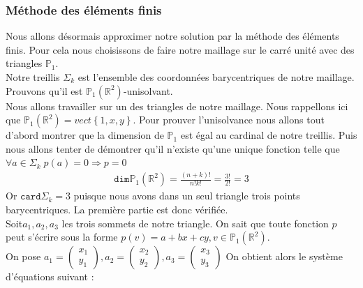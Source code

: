 \subsubsection{Méthode des éléments finis}
Nous allons désormais approximer notre solution par la méthode des éléments finis. Pour cela nous choisissons de faire notre maillage sur le carré unité avec des triangles $\mathbb{P}_{1}$.\\
Notre treillis $\Sigma_{k}$ est l'ensemble des coordonnées barycentriques de notre maillage. Prouvons qu'il est $\mathbb{P}_{1}\left(\mathbb{R}^ {2}\right)$-unisolvant.\\
Nous allons travailler sur un des triangles de notre maillage. Nous rappellons ici que $\mathbb{P}_{1}\left(\mathbb{R}^ {2}\right)=vect\left\{1, x, y\right\}$. Pour prouver l'unisolvance nous allons tout d'abord montrer que la dimension de $\mathbb{P}_{1}$ est égal au cardinal de notre treillis. Puis nous allons tenter de démontrer qu'il n'existe qu'une unique fonction telle que $\forall a\in \Sigma_{k}\; p(a)=0\Rightarrow p=0$\\
\begin{align*}
\mathtt{dim}\mathbb{P}_{1}\left(\mathbb{R}^ {2}\right)=\frac{\left(n+k\right)!}{n!k!}=\frac{3!}{2!}=3
\end{align*}
Or $\mathtt{card}\Sigma_{k}=3$ puisque nous avons dans un seul triangle trois points barycentriques. La première partie est donc vérifiée.\\
Soit$a_{1}, a_{2}, a_{3}$ les trois sommets de notre triangle. On sait que toute fonction $p$ peut s'écrire sous la forme $p(v)=a+bx+cy, v\in\mathbb{P}_{1}\left(\mathbb{R}^{2}\right)$.\\
On pose $a_{1}=\begin{pmatrix}
x_{1}\\
y_{1}
\end{pmatrix}
, a_{2}=\begin{pmatrix}
x_{2}\\
y_{2}
\end{pmatrix}
,a_{3}=\begin{pmatrix}
x_{3}\\
y_{3}
\end{pmatrix}$
On obtient alors le système d'équations suivant :\\
